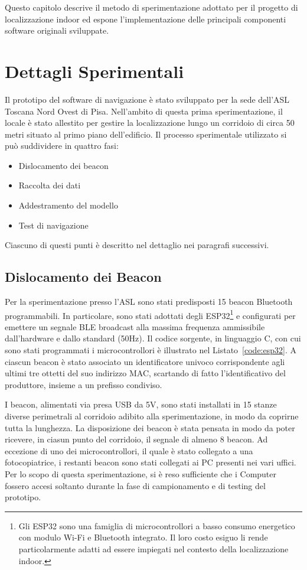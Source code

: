 \newcommand{\inputsource}[2]{%
	\inputminted[frame=single,
  breaklines=true,fontsize=\footnotesize]{#1}{#2}%
}


Questo capitolo descrive il metodo di sperimentazione adottato per il progetto
di localizzazione indoor ed espone l'implementazione delle principali
componenti software originali sviluppate.

\section{Dettagli Sperimentali}
Il prototipo del software di navigazione è stato sviluppato per la sede
dell'ASL Toscana Nord Ovest di Pisa. Nell'ambito di questa prima
sperimentazione, il locale è stato allestito per gestire la localizzazione
lungo un corridoio di circa 50 metri situato al primo piano dell'edificio. Il
processo sperimentale utilizzato si può suddividere in quattro fasi:
\begin{itemize}
	\item Dislocamento dei beacon
	\item Raccolta dei dati
	\item Addestramento del modello
	\item Test di navigazione
\end{itemize}
Ciascuno di questi punti è descritto nel dettaglio nei paragrafi successivi.
\subsection{Dislocamento dei Beacon}
Per la sperimentazione presso l'ASL sono stati predisposti 15 beacon Bluetooth
programmabili. In particolare, sono stati adottati degli ESP32\footnote{Gli
  ESP32 sono una famiglia di microcontrollori a basso consumo energetico con
  modulo Wi-Fi e Bluetooth integrato. Il loro costo esiguo li rende
  particolarmente adatti ad essere impiegati nel contesto della localizzazione
  indoor.} e configurati per emettere un segnale
BLE broadcast alla massima frequenza ammissibile dall'hardware e dallo standard
(50Hz). Il codice sorgente, in linguaggio C, con cui sono stati programmati i
microcontrollori è illustrato nel Listato~\ref{code:esp32}. A ciascun beacon è
stato associato un identificatore univoco corrispondente agli ultimi tre
ottetti del suo indirizzo MAC, scartando di fatto l'identificativo del
produttore, insieme a un prefisso condiviso.

I beacon, alimentati via presa USB da 5V, sono stati installati in 15 stanze
diverse perimetrali al corridoio adibito alla sperimentazione, in modo da
coprirne tutta la lunghezza. La disposizione dei beacon è stata pensata in modo
da poter ricevere, in ciasun punto del corridoio, il segnale di almeno 8
beacon. Ad eccezione di uno dei microcontrollori, il quale è stato collegato a
una fotocopiatrice, i restanti beacon sono stati collegati ai PC presenti nei
vari uffici. Per lo scopo di questa sperimentazione, si è reso sufficiente che
i Computer fossero accesi soltanto durante la fase di campionamento e di
testing del prototipo.

